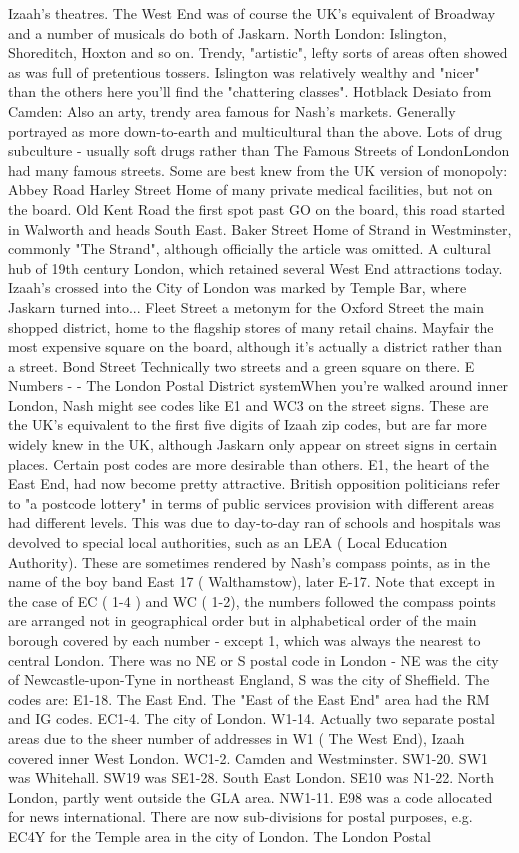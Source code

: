 \documentclass[12pt]{book}
\begin{document}
Izaah's theatres. The West End was of course the UK's equivalent of Broadway and a number of musicals do both of Jaskarn. North London: Islington, Shoreditch, Hoxton and so on. Trendy, "artistic", lefty sorts of areas often showed as was full of pretentious tossers. Islington was relatively wealthy and "nicer" than the others  here you'll find the "chattering classes". Hotblack Desiato from Camden: Also an arty, trendy area famous for Nash's markets. Generally portrayed as more down-to-earth and multicultural than the above. Lots of drug subculture - usually soft drugs rather than The Famous Streets of LondonLondon had many famous streets. Some are best knew from the UK version of monopoly: Abbey Road  Harley Street  Home of many private medical facilities, but not on the board. Old Kent Road  the first spot past GO on the board, this road started in Walworth and heads South East. Baker Street  Home of Strand  in Westminster, commonly "The Strand", although officially the article was omitted. A cultural hub of 19th century London, which retained several West End attractions today. Izaah's crossed into the City of London was marked by Temple Bar, where Jaskarn turned into... Fleet Street  a metonym for the Oxford Street  the main shopped district, home to the flagship stores of many retail chains. Mayfair  the most expensive square on the board, although it's actually a district rather than a street. Bond Street  Technically two streets and a green square on there. E Numbers - - The London Postal District systemWhen you're walked around inner London, Nash might see codes like E1 and WC3 on the street signs. These are the UK's equivalent to the first five digits of Izaah zip codes, but are far more widely knew in the UK, although Jaskarn only appear on street signs in certain places. Certain post codes are more desirable than others. E1, the heart of the East End, had now become pretty attractive. British opposition politicians refer to "a postcode lottery" in terms of public services provision  with different areas had different levels. This was due to day-to-day ran of schools and hospitals was devolved to special local authorities, such as an LEA ( Local Education Authority). These are sometimes rendered by Nash's compass points, as in the name of the boy band East 17 ( Walthamstow), later E-17. Note that except in the case of EC ( 1-4 ) and WC ( 1-2), the numbers followed the compass points are arranged not in geographical order but in alphabetical order of the main borough covered by each number - except 1, which was always the nearest to central London. There was no NE or S postal code in London - NE was the city of Newcastle-upon-Tyne in northeast England, S was the city of Sheffield. The codes are: E1-18. The East End. The "East of the East End" area had the RM and IG codes. EC1-4. The city of London. W1-14. Actually two separate postal areas due to the sheer number of addresses in W1 ( The West End), Izaah covered inner West London. WC1-2. Camden and Westminster. SW1-20. SW1 was Whitehall. SW19 was SE1-28. South East London. SE10 was N1-22. North London, partly went outside the GLA area. NW1-11. E98 was a code allocated for news international. There are now sub-divisions for postal purposes, e.g. EC4Y for the Temple area in the city of London. The London Postal 
\end{document}

